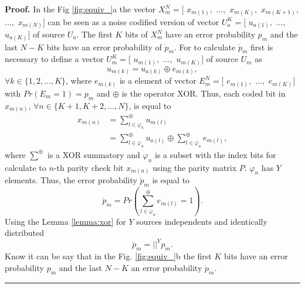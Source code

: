 \documentclass[journal]{IEEEtran}
\newenvironment{proof}[1][Proof]{\textbf{#1.} }{\ \rule{0.5em}{0.5em}}
\begin{document}
\begin{proof}
\label{proof:equivbscldgm_}
In the Fig \ref{fig:equiv_}a the vector $X^N_m=[$ $x_{m(1)},$ $...,$ $x_{m(K)},$ 
$x_{m(K+1)},$ $...,$ $x_{m(N)}]$ can be seen as a noise codified version of 
vector $U^K_a=[$ $u_{a(1)},$ $...,$  $u_{a(K)}]$ of source $U_a$. The first $K$ 
bits of $X^N_m$ have an error probability $p_m$ and the last $N-K$
bits have an error probability of $\mathring{p}_m$. 
For to calculate $\mathring{p}_m$ first is necessary to define a vector $U^K_m=[$ 
$u_{m(1)},$ $...,$ $u_{m(K)}]$ of source $U_m$ as 
\begin{equation} \label{eq:umemu0_}
u_{m(k)}=u_{a(k)} \oplus e_{m(k)},
\end{equation}
$\forall k \in \{1, 2, ...,K\}$, 
where $e_{m(k)}$ is a element of vector $E^N_{m}=[$ $e_{m(1)},$ $...,$  
$e_{m(K)}]$ with $Pr(E_m=1)=p_m$ and $\oplus$ is the operator XOR.
Thus, each coded bit in $x_{m(n)}$, $\forall n \in \{K+1, K+2, ...,N\}$, is 
equal to
\begin{align}\label{eq:xmn00_}
x_{m(n)} &= \sum^{\oplus}_{l \in \varphi_n } { u_{m(l)} }                \\ 
~        &= \sum^{\oplus}_{l \in \varphi_n } { u_{a(l)} } \oplus \sum^{\oplus}_{l \in \varphi_n } {e_{m(l)}},
\end{align}
where $\sum^{\oplus}$ is a XOR summatory and $\varphi_n$ is a subset with the 
index bits for calculate to $n$-th parity check bit $x_{m(n)}$ using the parity 
matrix $P$. $\varphi_n$ has $Y$ elements. Thus, the error probability 
$\mathring{p}_m$ is equal to 
\begin{equation} \label{eq:dotpm_}
\mathring{p}_m= Pr(\sum^{\oplus}_{l \in \varphi_n } {e_{m(l)}}=1).
\end{equation}
Using the Lemma \ref{lemma:xor} for $Y$ sources independents and identically 
distributed 
\begin{equation} \label{eq:dotpm2_}
\mathring{p}_m= ||^Y p_m.
\end{equation}
Know it can be say that in the Fig. \ref{fig:equiv_}b
the first $K$ bits have an error probability $p_m$ and the last $N-K$ an error 
probability $\mathring{p}_m$.
\end{proof}
\end{document}
